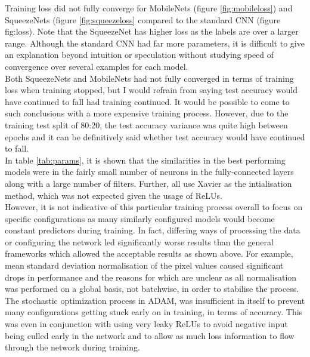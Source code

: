 \documentclass{article}
\begin{document}
{Training loss did not fully converge for MobileNets (figure \ref{fig:mobileloss}) and SqueezeNets (figure \ref{fig:squeezeloss} compared to the standard CNN (figure fig:loss). Note that the SqueezeNet has higher loss as the labels are over a larger range. Although the standard CNN had far more parameters, it is difficult to give an explanation beyond intuition or speculation without studying speed of convergence over several examples for each model. \\

Both SqueezeNets and MobileNets had not fully converged in terms of training loss when training stopped, but I would refrain from saying test accuracy would have continued to fall had training continued. It would be possible to come to such conclusions with a more expensive training process. However, due to the training test split of 80:20, the test accuracy variance was quite high between epochs and it can be definitively said whether test accuracy would have continued to fall.\\

In table \ref{tab:params}, it is shown that the similarities in the best performing models were in the fairly small number of neurons in the fully-connected layers along with a large number of filters. Further, all use Xavier as the intialisation method, which was not expected given the usage of ReLUs.\\

However, it is not indicative of this particular training process overall to focus on specific configurations as many similarly configured models would become constant predictors during training. In fact, differing ways of processing the data or configuring the network led significantly worse results than the general frameworks which allowed the acceptable results as shown above. For example, mean standard deviation normalisation of the pixel values caused significant drops in performance and the reasons for which are unclear as all normalisation was performed on a global basis, not batchwise, in order to stabilise the process. \\

The stochastic optimization process in ADAM, was insufficient in itself to prevent many configurations getting stuck early on in training, in terms of accuracy. This was even in conjunction with using very leaky ReLUs to avoid negative input being culled early in the network and to allow as much loss information to flow through the network during training.\\

}
\end{document}
